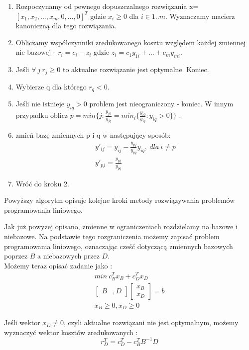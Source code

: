 \documentclass{classrep}
\begin{document}
\begin{enumerate}
\item Rozpoczynamy od pewnego dopuszczalnego rozwiązania x= $\left[ x_1, x_2,...,x_m,0,...,0 \right]^T$ gdzie $x_i \geq 0 $ dla $i \in 1..m$. Wyznaczamy macierz kanoniczną dla tego rozwiązania.
\item Obliczamy współczynniki zredukowanego kosztu względem każdej zmiennej nie bazowej -  $r_i = c_i - z_i $ gdzie $z_i = c_1 y_{1i}+ \dots + c_m y_{mi}$.
\item Jeśli $\forall\ j\ r_j \geq 0$ to aktualne rozwiązanie jest optymalne. Koniec.
\item Wybierze q dla którego $r_q  < 0$.
\item Jeśli  nie istnieje $y_{iq} >0$ problem jest nieograniczony - koniec. W innym przypadku oblicz $p = min \{ j : \frac{y_{j0}}{y_{jq}} = min_i \{ \frac{y_{i0}}{y_{iq}} : y_{iq} > 0 \} \}$ .
\item zmień bazę zmiennych p i q w następujący sposób:
\begin{eqnarray}
y'_{ij} = y_{ij} - \frac{y_{pj}}{y_{pq}} y_{iq},\ dla\ i \neq p\\
y'_{pj} = \frac{y_{pj}}{y_{pq}}
\end{eqnarray}
\item Wróć do kroku 2.
\end{enumerate}
Powyższy algorytm opisuje kolejne kroki metody rozwiązywania problemów programowania liniowego.

Jak już powyżej opisano, zmienne w ograniczeniach rozdzielamy na bazowe i niebazowe. Na podstawie tego rozgraniczenia możemy zapisać problem programowania liniowego, oznaczając cześć dotyczącą zmiennych bazowych poprzez $B$ a niebazowych przez $D$.\\
Możemy teraz opisać zadanie jako :
\begin{eqnarray}
min\ c^{T} _{B} x_{B} + c^{T}_{D}x_{D}\\
\left[ \begin{smallmatrix} B &, D \end{smallmatrix} \right] \left[ \begin{smallmatrix} x_B\\x_D \end{smallmatrix} \right] =b \\
x_{B} \geq 0, x_{D} \geq 0
\end{eqnarray}

Jeśli wektor $x_D \neq 0$, czyli aktualne rozwiązani nie jest optymalnym, możemy wyznaczyć wektor kosztów zredukowanych :
\begin{equation}
r^{T}_{D} = c^{T}_{D} - c^{T}_{B} B^{-1} D
\end{equation}
\end{document}
